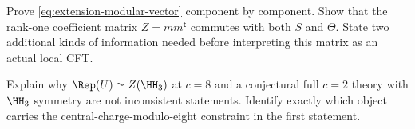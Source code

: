 \begin{exercise}\label{ex:modular-extension}
Prove \eqref{eq:extension-modular-vector} component by component.
Show that the rank-one coefficient matrix $Z=mm^{\mathsf t}$
commutes with both $S$ and $\Theta$.  State two additional kinds
of information needed before interpreting this matrix as an actual
local CFT.

\par\smallskip{}\par
\end{exercise}

\begin{exercise}\label{ex:central-charge-scope}
Explain why $\Rep(U)\simeq Z(\HH_3)$ at $c=8$ and a
conjectural full $c=2$ theory with $\HH_3$ symmetry are not
inconsistent statements.  Identify exactly which object carries
the central-charge-modulo-eight constraint in the first statement.

\par\smallskip{}\par
\end{exercise}
